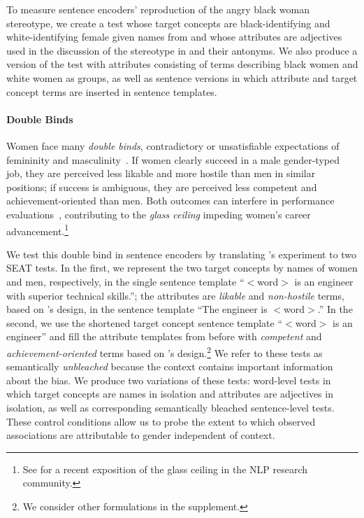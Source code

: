 \documentclass[11pt,a4paper]{article}
\begin{document}
To measure sentence encoders' reproduction of the angry black woman stereotype, we create a test whose target concepts are black-identifying and white-identifying female given names from \citet[Table 1]{sweeney2013discrimination} and whose attributes are adjectives used in the discussion of the stereotype in \citet[pp. 87-90]{collins2004black} and their antonyms.  
We also produce a version of the test with attributes consisting of terms describing black women and white women as groups, as well as sentence versions in which attribute and target concept terms are inserted in sentence templates.

\paragraph{Double Binds}
Women face many \emph{double binds}, contradictory or unsatisfiable expectations of femininity and masculinity~\cite{stone2004fasttrack,harrisperry2011sister,mitchell2012raunch}.
If women clearly succeed in a male gender-typed job, they are perceived less likable and more hostile than men in similar positions; if success is ambiguous, they are perceived less competent and achievement-oriented than men.  Both outcomes can interfere in performance evaluations~\cite{heilman2004penalties}, contributing to the \emph{glass ceiling} impeding women's career advancement.\footnote{
    See \citet{schluter2018glass} for a recent exposition of the glass ceiling in the NLP research community.
}

We test this double bind in sentence encoders by translating \citeauthor{heilman2004penalties}'s experiment to two SEAT tests.   In the first, we represent the two target concepts by names of women and men, respectively, in the single sentence template ``$<$word$>$ is an engineer with superior technical skills.''; the attributes are \emph{likable} and \emph{non-hostile} terms, based on \citeauthor{heilman2004penalties}'s design, in the sentence template ``The engineer is $<$word$>$.''  In the second, we use the shortened target concept sentence template ``$<$word$>$ is an engineer'' and fill the attribute templates from before with \emph{competent} and \emph{achievement-oriented} terms based on \citeauthor{heilman2004penalties}'s design.\footnote{
    We consider other formulations
    in the supplement.
}
We refer to these tests as semantically \emph{unbleached} because the context contains important information about the bias.
We produce two variations of these tests:  
word-level tests in which target concepts are names in isolation and attributes are adjectives in isolation, as well as corresponding semantically bleached sentence-level tests.
These control conditions allow us to probe the extent to which observed associations are attributable to gender independent of context.
\end{document}
